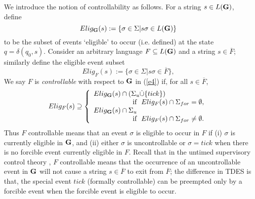 \documentclass[twocolumn]{autart}
\begin{document}
We introduce the notion of controllability as follows. For a string $s \in L({\bf G})$, define
\begin{equation} \label{e11}
Elig_{\bf G}(s):=\{\sigma \in \Sigma|s\sigma \in L({\bf G})\}
\end{equation}
to be the subset of events `eligible' to occur (i.e. defined) at the
state $q = \delta(q_0, s)$. Consider an arbitrary language $F
\subseteq L({\bf G})$ and a string $s \in \overline{F}$; similarly
define the eligible event subset
\begin{equation} \label{e12}
Elig_F(s):= \{\sigma \in \Sigma|s\sigma \in \overline{F}\},
\end{equation}
We say $F$ is {\it controllable} with respect to $\bf G$ in
(\ref{e4}) if, for all $s \in \overline{F}$,
\begin{eqnarray} \label{eq:control}
Elig_F(s)\supseteq
\left\{
   \begin{array}{lcl}
      Elig_{\bf G}(s)\cap(\Sigma_u \dot{\cup}\{tick\}) \\
      ~~~~~~~~~~~~~~~~~\text{if} ~~Elig_F(s)\cap \Sigma_{for} = \emptyset,\\
      Elig_{\bf G}(s)\cap\Sigma_u               \\
      ~~~~~~~~~~~~~~~~~\text{if} ~~Elig_F(s)\cap \Sigma_{for} \neq \emptyset.
   \end{array}
\right.
\end{eqnarray}
Thus $F$ controllable means that an event $\sigma$ is eligible to
occur in $F$ if (i) $\sigma$ is currently eligible in $\bf G$, and
(ii) either $\sigma$ is uncontrollable or $\sigma = tick$ when there
is no forcible event currently eligible in $F$. Recall that in the
untimed supervisory control theory
\cite{RamadgeWonham:87,Wonham:2011a}, $F$ controllable means that
the occurrence of an uncontrollable event in $\bf G$ will not cause
a string $s \in \overline{F}$ to exit from $\overline{F}$; the
difference in TDES is that, the special event $tick$ (formally
controllable) can be preempted only by a forcible event when the
forcible event is eligible to occur.
\end{document}
